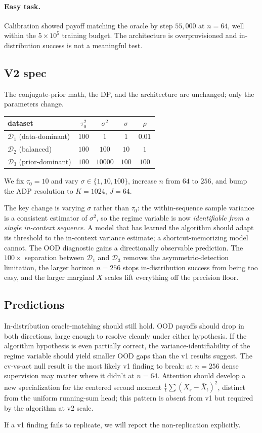 \documentclass[11pt]{article}
\begin{document}
\paragraph{Easy task.} Calibration showed payoff matching the oracle by step $55{,}000$ at $n = 64$, well within the $5\times 10^5$ training budget. The architecture is overprovisioned and in-distribution success is not a meaningful test.

\subsection{V2 spec}

The conjugate-prior math, the DP, and the architecture are unchanged; only the parameters change.
\begin{center}
\small
\begin{tabular}{l c c c c}
\hline
dataset & $\tau_0^2$ & $\sigma^2$ & $\sigma$ & $\rho$ \\
\hline
$\mathcal{D}_1$ (data-dominant)    & $100$ & $1$     & $1$   & $0.01$ \\
$\mathcal{D}_2$ (balanced)         & $100$ & $100$   & $10$  & $1$ \\
$\mathcal{D}_3$ (prior-dominant)   & $100$ & $10000$ & $100$ & $100$ \\
\hline
\end{tabular}
\end{center}
We fix $\tau_0 = 10$ and vary $\sigma \in \{1, 10, 100\}$, increase $n$ from $64$ to $256$, and bump the ADP resolution to $K = 1024$, $J = 64$.

The key change is varying $\sigma$ rather than $\tau_0$: the within-sequence sample variance is a consistent estimator of $\sigma^2$, so the regime variable is now \emph{identifiable from a single in-context sequence}. A model that has learned the algorithm should adapt its threshold to the in-context variance estimate; a shortcut-memorizing model cannot. The OOD diagnostic gains a directionally observable prediction. The $100\times$ separation between $\mathcal{D}_1$ and $\mathcal{D}_3$ removes the asymmetric-detection limitation, the larger horizon $n = 256$ stops in-distribution success from being too easy, and the larger marginal $X$ scales lift everything off the precision floor.

\subsection{Predictions}

In-distribution oracle-matching should still hold. OOD payoffs should drop in both directions, large enough to resolve cleanly under either hypothesis. If the algorithm hypothesis is even partially correct, the variance-identifiability of the regime variable should yield smaller OOD gaps than the v1 results suggest. The cv-vs-act null result is the most likely v1 finding to break: at $n = 256$ dense supervision may matter where it didn't at $n = 64$. Attention should develop a new specialization for the centered second moment $\frac{1}{t}\sum (X_s - \bar X_t)^2$, distinct from the uniform running-sum head; this pattern is absent from v1 but required by the algorithm at v2 scale.

If a v1 finding fails to replicate, we will report the non-replication explicitly.
\end{document}
